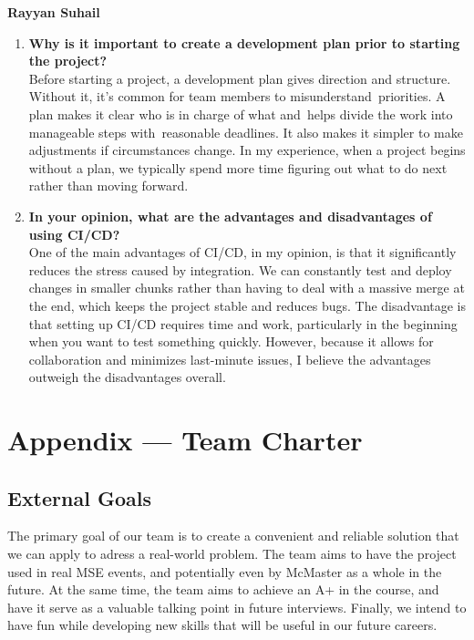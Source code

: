 \documentclass{article}
\begin{document}
\textbf{Rayyan Suhail}
\begin{enumerate}
    \item \textbf{Why is it important to create a development plan prior to starting the
    project?}\\

    Before starting a project, a development plan gives direction and structure. Without it, it's common for team members to misunderstand priorities. A plan makes it clear who is in charge of what and helps divide the work into manageable steps with reasonable deadlines. It also makes it simpler to make adjustments if circumstances change. In my experience, when a project begins without a plan, we typically spend more time figuring out what to do next rather than moving forward.

    \item \textbf{In your opinion, what are the advantages and disadvantages of using
    CI/CD?}\\

    One of the main advantages of CI/CD, in my opinion, is that it significantly reduces the stress caused by integration. We can constantly test and deploy changes in smaller chunks rather than having to deal with a massive merge at the end, which keeps the project stable and reduces bugs. The disadvantage is that setting up CI/CD requires time and work, particularly in the beginning when you want to test something quickly. However, because it allows for collaboration and minimizes last-minute issues, I believe the advantages outweigh the disadvantages overall.
\end{enumerate}

\newpage{}

\section*{Appendix --- Team Charter}


\subsection*{External Goals}

The primary goal of our team is to create a convenient and reliable solution that we can apply to adress a real-world problem. The team aims to have the project used in real MSE events, and potentially even by McMaster as a whole in the future. At the same time, the team aims to achieve an A+ in the course, and have it serve as a valuable talking point in future interviews. Finally, we intend to have fun while developing new skills that will be useful in our future careers.
\end{document}
